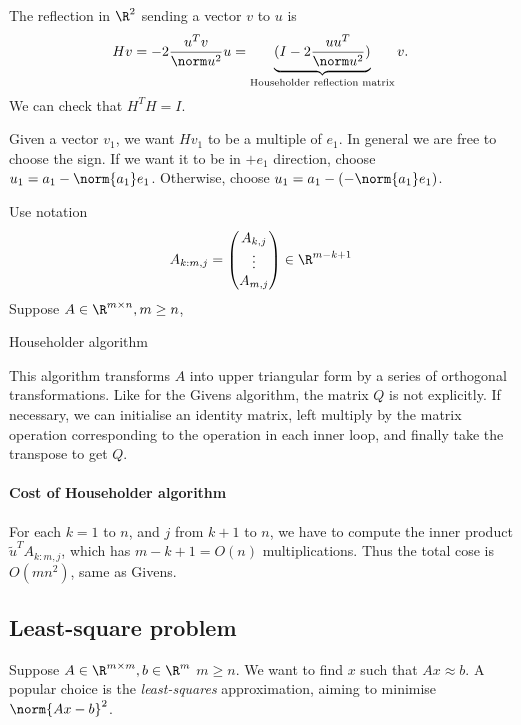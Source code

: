 \documentclass[a4paper]{article}
\begin{document}
The reflection in \(\R^2\) sending a vector \(v\) to \(u\) is
\[
  Hv =  - 2 \frac{u^Tv}{\norm u^2}u = \underbrace{(I - 2 \frac{uu^T}{\norm u^2})}_{\text{Householder reflection matrix}} v.
\]
We can check that \(H^TH = I\).

Given a vector \(v_1\), we want \(Hv_1\) to be a multiple of \(e_1\). In general we are free to choose the sign. If we want it to be in \(+e_1\) direction, choose \(u_1 = a_1 - \norm{a_1}e_1\). Otherwise, choose \(u_1 = a_1 - (-\norm{a_1}e_1)\).

Use notation
\[
  A_{k:m, j} =
  \begin{pmatrix}
    A_{k, j} \\
    \vdots \\
    A_{m, j}
  \end{pmatrix}
  \in \R^{m - k + 1}
\]
Suppose \(A \in \R^{m \times n}, m \geq n\),

\begin{algorithm}
  \caption{Householder algorithm}
\end{algorithm}

This algorithm transforms \(A\) into upper triangular form by a series of orthogonal transformations. Like for the Givens algorithm, the matrix \(Q\) is not explicitly. If necessary, we can initialise an identity matrix, left multiply by the matrix operation corresponding to the operation in each inner loop, and finally take the transpose to get \(Q\).

\paragraph{Cost of Householder algorithm}

For each \(k = 1\) to \(n\), and \(j\) from \(k + 1\) to \(n\), we have to compute the inner product \(\tilde u^T A_{k:m, j}\), which has \(m - k + 1 = O(n)\) multiplications. Thus the total cose is \(O(mn^2)\), same as Givens.

\subsection{Least-square problem}

Suppose \(A \in \R^{m \times m}, b \in \R^m\) \(m \geq n\). We want to find \(x\) such that \(Ax \approx b\). A popular choice is the \emph{least-squares} approximation, aiming to minimise \(\norm{Ax - b}^2\).
\end{document}
